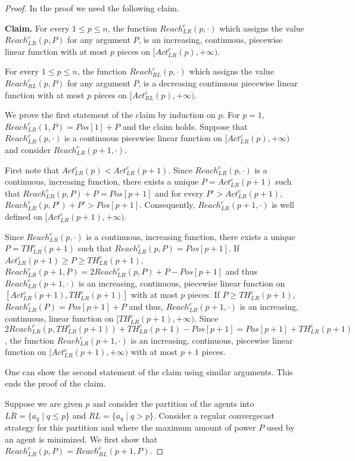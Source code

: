 \documentclass{article}
\newcommand\rclr{Reach_{LR}^c\xspace}
\newcommand\rcrl{Reach_{RL}^c\xspace}
\newcommand\acrl{Act_{RL}^c\xspace}
\newcommand\aclr{Act_{LR}^c\xspace}
\newcommand\tclr{TH_{LR}^c\xspace}
\newcommand\convergecast{convergecast\xspace}
\begin{document}
\begin{proof}
In the proof we need the following claim. 

\medskip

\noindent\textbf{Claim. }
For every $1 \leq p \leq n$, the function $\rclr(p,\cdot)$ which assigns the value $\rclr(p,P)$ for any argument $P$, is an increasing, continuous, piecewise linear function with at most $p$ pieces on $[\aclr(p),+\infty)$.

For every $1 \leq p \leq n$, the function $\rcrl(p,\cdot)$ which assigns the value $\rcrl(p,P)$ for any argument $P$, is a decreasing continuous piecewise linear function with at most $p$ pieces on $[\acrl(p),+\infty)$.

\medskip

We prove the first statement of the claim by induction on $p$. For
$p=1$, $\rclr(1,P) = Pos[1]+ P$ and the claim holds. Suppose that
$\rclr(p,\cdot)$ is a continuous piecewise linear function on
$[\aclr(p),+\infty)$ and consider $\rclr(p+1,\cdot)$.

First note that $\aclr(p) < \aclr(p+1)$. Since
$\rclr(p,\cdot)$ is a continuous, increasing function, there
exists a unique $P = \aclr(p+1)$ such that $\rclr(p,P) + P =
Pos[p+1]$ and for every $P' > \aclr(p+1)$, $\rclr(p,P') + P' >
Pos[p+1]$. Consequently, $\rclr(p+1,\cdot)$ is well defined
on $[\aclr(p+1),+\infty)$. 

Since $\rclr(p,\cdot)$ is a continuous, increasing function, there
exists a unique $P = \tclr(p+1)$ such that $\rclr(p,P) =
Pos[p+1]$. If $\aclr(p+1) \geq P \geq \tclr(p+1)$,
$\rclr(p+1,P) = 2\rclr(p,P)+ P - Pos[p+1]$ and thus
$\rclr(p+1,\cdot)$ is an increasing, continuous, piecewise linear
function on $[\aclr(p+1), \tclr(p+1)]$ with at most $p$ pieces. If $P \geq \tclr(p+1)$,
$\rclr(P) = Pos[p+1] + P$ and thus, $\rclr(p+1,\cdot)$ is an
increasing, continuous, linear function on $[\tclr(p+1),
  +\infty)$. Since $ 2\rclr(p,\tclr(p+1)) + \tclr(p+1) -
  Pos[p+1] = Pos[p+1]+ \tclr(p+1)$, the function $\rclr(p+1,\cdot)$ is an
  increasing, continuous, piecewise linear function on $[\aclr(p+1),
    +\infty)$ with at most $p+1$ pieces. 

One can show the second statement of the claim using similar
arguments. This ends the proof of the claim.



Suppose we are given $p$ and consider the partition of the agents into
$LR= \{a_q \mid q \leq p\}$ and $RL = \{a_q \mid q > p\}$. Consider a regular
{\convergecast} strategy for this partition and where the maximum
amount of power $P$ used by an agent is minimized. We first show that
$\rclr(p,P) = \rcrl(p+1,P)$.


\end{proof}
\end{document}
